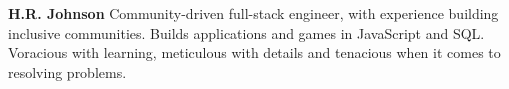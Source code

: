 \documentclass[10.5pt, oneside]{memoir}
\begin{document}
\begin{minipage}[t][0.6in][b]{5in}
    {\fontsize{34pt}{40pt}\selectfont
        \rmfamily\textbf{H.R. Johnson}}
    \vfill
    Community-driven full-stack engineer, with experience building inclusive
    communities. Builds applications and games in JavaScript and SQL. Voracious
    with learning, meticulous with details and tenacious when it comes to
    resolving
    problems.

\end{minipage}
\vskip15pt
\end{document}
